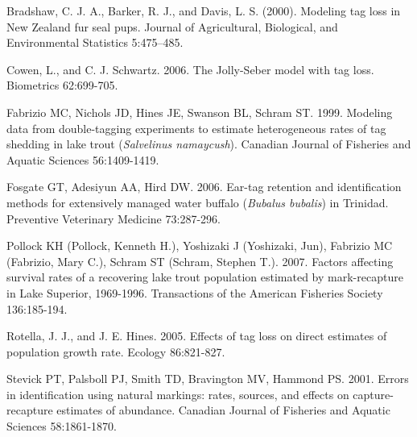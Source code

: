 \documentclass{article}
\begin{document}
Bradshaw, C. J. A., Barker, R. J., and Davis, L. S. (2000). Modeling tag 
loss in New Zealand fur seal pups. Journal of Agricultural, Biological, and 
Environmental Statistics 5:475--485.

Cowen, L., and C. J. Schwartz. 2006. The Jolly-Seber model with tag loss. 
Biometrics 62:699-705.

Fabrizio MC, Nichols JD, Hines JE, Swanson BL, Schram ST. 1999. Modeling 
data from double-tagging experiments to estimate heterogeneous rates of tag 
shedding in lake trout (\textit{Salvelinus namaycush}). Canadian Journal of Fisheries and Aquatic 
Sciences 56:1409-1419.

Fosgate GT, Adesiyun AA, Hird DW. 2006. Ear-tag retention and identification 
methods for extensively managed water buffalo (\textit{Bubalus bubalis}) in Trinidad. Preventive 
Veterinary Medicine 73:287-296.

Pollock KH (Pollock, Kenneth H.), Yoshizaki J (Yoshizaki, Jun), Fabrizio MC 
(Fabrizio, Mary C.), Schram ST (Schram, Stephen T.). 2007. Factors affecting 
survival rates of a recovering lake trout population estimated by 
mark-recapture in Lake Superior, 1969-1996. Transactions of the American 
Fisheries Society 136:185-194.

Rotella, J. J., and J. E. Hines. 2005. Effects of tag loss on direct 
estimates of population growth rate. Ecology 86:821-827.

Stevick PT, Palsboll PJ, Smith TD, Bravington MV, Hammond PS. 2001. Errors 
in identification using natural markings: rates, sources, and effects on 
capture-recapture estimates of abundance. Canadian Journal of Fisheries and 
Aquatic Sciences 58:1861-1870.
\end{document}
